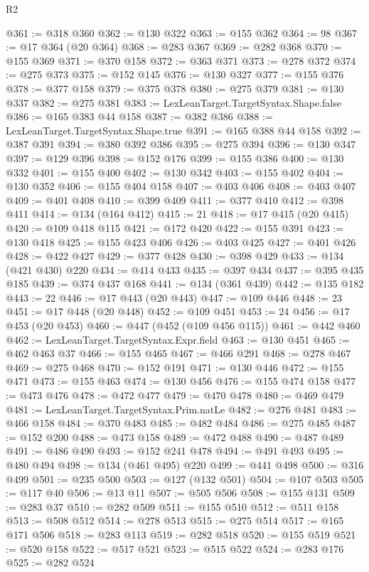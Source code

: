 \begin{lexlean}{R2}
\begin{coremodule}
@361 := @318 @360
@362 := @130 @322
@363 := @155 @362
@364 := 98
@367 := @17 @364 (@20 @364)
@368 := @283 @367
@369 := @282 @368
@370 := @155 @369
@371 := @370 @158
@372 := @363 @371
@373 := @278 @372
@374 := @275 @373
@375 := @152 @145
@376 := @130 @327
@377 := @155 @376
@378 := @377 @158
@379 := @375 @378
@380 := @275 @379
@381 := @130 @337
@382 := @275 @381
@383 := LexLeanTarget.TargetSyntax.Shape.false
@386 := @165 @383 @44 @158
@387 := @382 @386
@388 := LexLeanTarget.TargetSyntax.Shape.true
@391 := @165 @388 @44 @158
@392 := @387 @391
@394 := @380 @392 @386
@395 := @275 @394
@396 := @130 @347
@397 := @129 @396
@398 := @152 @176
@399 := @155 @386
@400 := @130 @332
@401 := @155 @400
@402 := @130 @342
@403 := @155 @402
@404 := @130 @352
@406 := @155 @404 @158
@407 := @403 @406
@408 := @403 @407
@409 := @401 @408
@410 := @399 @409
@411 := @377 @410
@412 := @398 @411
@414 := @134 (@164 @412)
@415 := 21
@418 := @17 @415 (@20 @415)
@420 := @109 @418 @115
@421 := @172 @420
@422 := @155 @391
@423 := @130 @418
@425 := @155 @423 @406
@426 := @403 @425
@427 := @401 @426
@428 := @422 @427
@429 := @377 @428
@430 := @398 @429
@433 := @134 (@421 @430) @220
@434 := @414 @433
@435 := @397 @434
@437 := @395 @435 @185
@439 := @374 @437 @168
@441 := @134 (@361 @439)
@442 := @135 @182
@443 := 22
@446 := @17 @443 (@20 @443)
@447 := @109 @446
@448 := 23
@451 := @17 @448 (@20 @448)
@452 := @109 @451
@453 := 24
@456 := @17 @453 (@20 @453)
@460 := @447 (@452 (@109 @456 @115))
@461 := @442 @460
@462 := LexLeanTarget.TargetSyntax.Expr.field
@463 := @130 @451
@465 := @462 @463 @37
@466 := @155 @465
@467 := @466 @291
@468 := @278 @467
@469 := @275 @468
@470 := @152 @191
@471 := @130 @446
@472 := @155 @471
@473 := @155 @463
@474 := @130 @456
@476 := @155 @474 @158
@477 := @473 @476
@478 := @472 @477
@479 := @470 @478
@480 := @469 @479
@481 := LexLeanTarget.TargetSyntax.Prim.natLe
@482 := @276 @481
@483 := @466 @158
@484 := @370 @483
@485 := @482 @484
@486 := @275 @485
@487 := @152 @200
@488 := @473 @158
@489 := @472 @488
@490 := @487 @489
@491 := @486 @490
@493 := @152 @241 @478
@494 := @491 @493
@495 := @480 @494
@498 := @134 (@461 @495) @220
@499 := @441 @498
@500 := @316 @499
@501 := @235 @500
@503 := @127 (@132 @501)
@504 := @107 @503
@505 := @117 @40
@506 := @13 @11
@507 := @505 @506
@508 := @155 @131
@509 := @283 @37
@510 := @282 @509
@511 := @155 @510
@512 := @511 @158
@513 := @508 @512
@514 := @278 @513
@515 := @275 @514
@517 := @165 @171 @506
@518 := @283 @113
@519 := @282 @518
@520 := @155 @519
@521 := @520 @158
@522 := @517 @521
@523 := @515 @522
@524 := @283 @176
@525 := @282 @524

\end{coremodule}
\end{lexlean}
